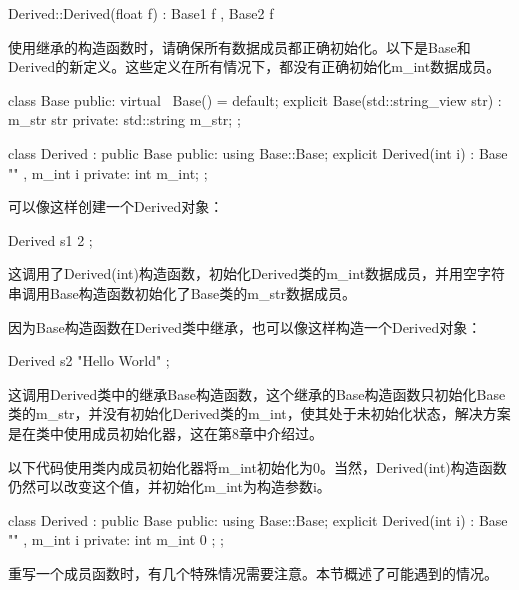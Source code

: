 \begin{cpp}
Derived::Derived(float f) : Base1 { f }, Base2 { f } {}
\end{cpp}


使用继承的构造函数时，请确保所有数据成员都正确初始化。以下是Base和Derived的新定义。这些定义在所有情况下，都没有正确初始化m\_int数据成员。

\begin{cpp}
class Base
{
    public:
        virtual ~Base() = default;
        explicit Base(std::string_view str) : m_str { str } {}
    private:
        std::string m_str;
};

class Derived : public Base
{
    public:
        using Base::Base;
        explicit Derived(int i) : Base { "" }, m_int { i } {}
    private:
        int m_int;
};
\end{cpp}

可以像这样创建一个Derived对象：

\begin{cpp}
Derived s1 { 2 };
\end{cpp}

这调用了Derived(int)构造函数，初始化Derived类的m\_int数据成员，并用空字符串调用Base构造函数初始化了Base类的m\_str数据成员。

因为Base构造函数在Derived类中继承，也可以像这样构造一个Derived对象：

\begin{cpp}
Derived s2 { "Hello World" };
\end{cpp}

这调用Derived类中的继承Base构造函数，这个继承的Base构造函数只初始化Base类的m\_str，并没有初始化Derived类的m\_int，使其处于未初始化状态，解决方案是在类中使用成员初始化器，这在第8章中介绍过。

以下代码使用类内成员初始化器将m\_int初始化为0。当然，Derived(int)构造函数仍然可以改变这个值，并初始化m\_int为构造参数i。

\begin{cpp}
class Derived : public Base
{
    public:
        using Base::Base;
        explicit Derived(int i) : Base { "" }, m_int { i } {}
    private:
        int m_int { 0 };
};
\end{cpp}


重写一个成员函数时，有几个特殊情况需要注意。本节概述了可能遇到的情况。


